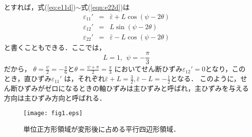 \documentclass[10pt,a4j]{jarticle}
\begin{document}
\begin{enumerate}
\begin{equation}
	\end{equation}
	とすれば，式(\ref{eq:e11d})$\sim$式(\ref{eqn:e22d})は
	\begin{eqnarray}
		\varepsilon_{11}' &=& 
			\bar \varepsilon + 
			L \cos \left( \psi-2\theta  \right)	
			\label{eqn:e11d2}
			\\
		\varepsilon_{12}' &=& 
			L \sin \left( \psi-2\theta  \right)	
			\label{eqn:e12d2}
			\\
		\varepsilon_{22}' &=& 
			\bar \varepsilon - 
			L \cos \left( \psi-2\theta  \right)	
			\label{eqn:e22d2}
	\end{eqnarray}
	と書くこともできる．ここでは，
	\[
		L=1, \ \ \psi =-\frac{\pi}{3}
	\]
	だから，
	$\theta=\frac{\psi}{2}=-\frac{\pi}{6}$と$\theta=\frac{\psi+\pi}{2}=\frac{\pi}{3}$
	においてせん断ひずみ$\varepsilon_{12}'=0$となり，このとき，直ひずみ$\varepsilon_{11}'$
	は，それぞれ$\bar \varepsilon+L=\frac{3}{2}, \bar \varepsilon -L=-\frac{1}{2}$となる．
	このように，せん断ひずみがゼロになるときの軸ひずみは主ひずみと呼ばれ，主ひずみを与える
	方向は主ひずみ方向と呼ばれる．
\end{enumerate}
\begin{figure}[h]
	\begin{center}
	\texttt{[image: fig1.eps]} 
	\end{center}
	\vspace{-5mm}
	\caption{単位正方形領域が変形後に占める平行四辺形領域．} 
	\label{fig:fig1}
\end{figure}
\end{document}
